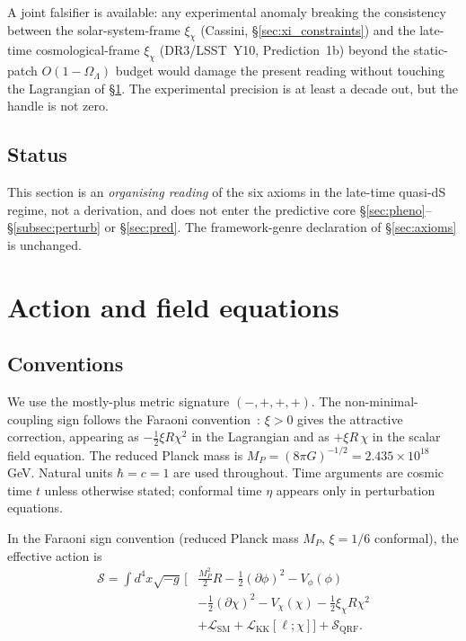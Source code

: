 \documentclass[epjc3,twocolumn]{svjour3}
\begin{document}
A joint falsifier is available: any experimental anomaly breaking the
consistency between the solar-system-frame $\xi_\chi$ (Cassini,
\S\ref{sec:xi_constraints}) and the late-time cosmological-frame
$\xi_\chi$ (DR3/LSST~Y10, Prediction~1b) beyond the static-patch
$O(1-\Omega_\Lambda)$ budget would damage the present reading without
touching the Lagrangian of \S\ref{sec:action}. The experimental precision is at least a
decade out, but the handle is not zero.

\subsection*{Status}

This section is an \emph{organising reading} of the six axioms in the
late-time quasi-dS regime, not a derivation, and does not enter the
predictive core \S\ref{sec:pheno}--\S\ref{subsec:perturb} or \S\ref{sec:pred}. The framework-genre declaration of
\S\ref{sec:axioms} is unchanged.


\section{Action and field equations}\label{sec:action}

\subsection*{Conventions}
We use the mostly-plus metric signature $(-,+,+,+)$. The non-minimal-coupling sign follows the Faraoni convention~\cite{Faraoni2004}: $\xi > 0$ gives the attractive correction, appearing as $-\tfrac{1}{2}\xi R \chi^2$ in the Lagrangian and as $+\xi R\,\chi$ in the scalar field equation. The reduced Planck mass is $M_P = (8\pi G)^{-1/2} = 2.435 \times 10^{18}$ GeV. Natural units $\hbar = c = 1$ are used throughout. Time arguments are cosmic time $t$ unless otherwise stated; conformal time $\eta$ appears only in perturbation equations.

In the Faraoni sign convention (reduced Planck mass $M_P$, $\xi = 1/6$ conformal), the effective action is
\begin{align}
\mathcal{S} = \int d^4 x \sqrt{-g}\, \Big[ & \frac{M_P^2}{2} R - \tfrac{1}{2}(\partial \phi)^2 - V_\phi(\phi) \nonumber \\
& - \tfrac{1}{2}(\partial \chi)^2 - V_\chi(\chi) - \tfrac{1}{2}\xi_\chi R \chi^2 \nonumber \\
& + \mathcal{L}_{\mathrm{SM}} + \mathcal{L}_{\mathrm{KK}}[\ell; \chi] \Big] + \mathcal{S}_{\mathrm{QRF}}.
\end{align}
\end{document}
